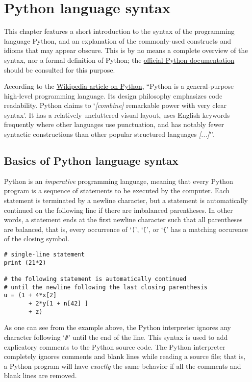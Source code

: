 
\chapter{Python language syntax}
\label{chap:python}

This chapter features a short introduction to the syntax of the
programming language Python, and an explanation of the commonly-used
constructs and idioms that may appear obscure.  This is by no means a
complete overview of the syntax, nor a formal definition of Python;
the \href{http://docs.python.org/2.6/}{official Python documentation}
\cite{python:docs, python:reference} should be consulted for this
purpose.

According to the
\href{http://en.wikipedia.org/wiki/Python_(programming_language)}
{Wikipedia article on Python}, ``Python is a general-purpose
high-level programming language. Its design philosophy emphasizes code
readability. Python claims to `\emph{[combine]} remarkable power with
very clear syntax'. It has a relatively uncluttered visual layout,
uses English keywords frequently where other languages use
punctuation, and has notably fewer syntactic constructions than other
popular structured languages \emph{[...]}\'''.


\section{Basics of Python language syntax}
\label{sec:syntax}

Python is an \emph{imperative} programming language, meaning that
every Python program is a sequence of statements to be executed by the
computer.  Each statement is terminated by a newline character, but a
statement is automatically continued on the following line if there
are imbalanced parentheses.  In other words, a statement ends at the
first newline character such that all parentheses are balanced, that
is, every occurrence of `\verb"("', `\verb"["', or `\verb"{"' has a
matching occurence of the closing symbol.
\begin{lstlisting}
# single-line statement
print (21*2)

# the following statement is automatically continued
# until the newline following the last closing parenthesis
u = (1 + 4*x[2] 
       + 2*y[1 + n[42] ]
       + z)
\end{lstlisting}
As one can see from the example above, the Python interpreter ignores
any character following `\verb"#"' until the end of the line.  This
syntax is used to add explicatory comments to the Python source code.
The Python interpreter completely ignores comments and blank lines
while reading a source file; that is, a Python program will have
\emph{exactly} the same behavior if all the comments and blank lines
are removed.

